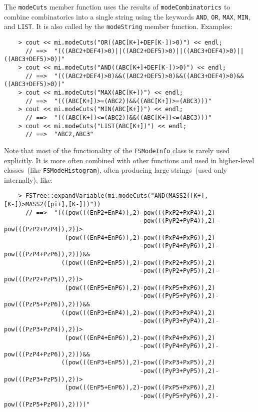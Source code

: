 \documentclass[11pt]{article}
\begin{document}
The {\tt modeCuts} member function uses the results of {\tt modeCombinatorics} to combine combinatorics into a single string using the keywords {\tt AND}, {\tt OR}, {\tt MAX}, {\tt MIN}, and {\tt LIST}.  It is also called by the {\tt modeString} member function.  Examples:
\begin{verbatim}
    > cout << mi.modeCuts("OR((ABC[K+]+DEF[K-])>0)") << endl;
      // ==>  "(((ABC2+DEF4)>0)||((ABC2+DEF5)>0)||((ABC3+DEF4)>0)||((ABC3+DEF5)>0))"
    > cout << mi.modeCuts("AND((ABC[K+]+DEF[K-])>0)") << endl;
      // ==>  "(((ABC2+DEF4)>0)&&((ABC2+DEF5)>0)&&((ABC3+DEF4)>0)&&((ABC3+DEF5)>0))"
    > cout << mi.modeCuts("MAX(ABC[K+])") << endl;
      // ==>  "(((ABC[K+])>=(ABC2))&&((ABC[K+])>=(ABC3)))"
    > cout << mi.modeCuts("MIN(ABC[K+])") << endl;
      // ==>  "(((ABC[K+])<=(ABC2))&&((ABC[K+])<=(ABC3)))"
    > cout << mi.modeCuts("LIST(ABC[K+])") << endl;
      // ==>  "ABC2,ABC3"
\end{verbatim}

Note that most of the functionality of the {\tt FSModeInfo} class is rarely used explicitly.  It is more often combined with other functions and used in higher-level classes~(like {\tt FSModeHistogram}), often producing large strings~(used only internally), like:
\begin{verbatim}
    > FSTree::expandVariable(mi.modeCuts("AND(MASS2([K+],[K-])>MASS2([pi+],[K-]))"))
      // ==>  "(((pow(((EnP2+EnP4)),2)-pow(((PxP2+PxP4)),2)
                                      -pow(((PyP2+PyP4)),2)-pow(((PzP2+PzP4)),2))>
                 (pow(((EnP4+EnP6)),2)-pow(((PxP4+PxP6)),2)
                                      -pow(((PyP4+PyP6)),2)-pow(((PzP4+PzP6)),2)))&&
                ((pow(((EnP2+EnP5)),2)-pow(((PxP2+PxP5)),2)
                                      -pow(((PyP2+PyP5)),2)-pow(((PzP2+PzP5)),2))>
                 (pow(((EnP5+EnP6)),2)-pow(((PxP5+PxP6)),2)
                                      -pow(((PyP5+PyP6)),2)-pow(((PzP5+PzP6)),2)))&&
                ((pow(((EnP3+EnP4)),2)-pow(((PxP3+PxP4)),2)
                                      -pow(((PyP3+PyP4)),2)-pow(((PzP3+PzP4)),2))>
                 (pow(((EnP4+EnP6)),2)-pow(((PxP4+PxP6)),2)
                                      -pow(((PyP4+PyP6)),2)-pow(((PzP4+PzP6)),2)))&&
                ((pow(((EnP3+EnP5)),2)-pow(((PxP3+PxP5)),2)
                                      -pow(((PyP3+PyP5)),2)-pow(((PzP3+PzP5)),2))>
                 (pow(((EnP5+EnP6)),2)-pow(((PxP5+PxP6)),2)
                                      -pow(((PyP5+PyP6)),2)-pow(((PzP5+PzP6)),2))))"
\end{verbatim} 
\end{document}
